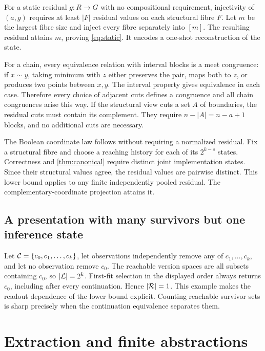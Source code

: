 For a static residual $g:R\to G$ with no compositional requirement, injectivity of $(a,g)$ requires at least $|F|$ residual values on each structural fibre $F$. Let $m$ be the largest fibre size and inject every fibre separately into $[m]$. The resulting residual attains $m$, proving \eqref{eq:static}. It encodes a one-shot reconstruction of the state.

For a chain, every equivalence relation with interval blocks is a meet congruence: if $x\sim y$, taking minimum with $z$ either preserves the pair, maps both to $z$, or produces two points between $x,y$. The interval property gives equivalence in each case. Therefore every choice of adjacent cuts defines a congruence and all chain congruences arise this way. If the structural view cuts a set $A$ of boundaries, the residual cuts must contain its complement. They require $n-|A|=n-a+1$ blocks, and no additional cuts are necessary.

The Boolean coordinate law follows without requiring a normalized residual. Fix a structural fibre and choose a reaching history for each of its $2^{k-s}$ states. Correctness and \cref{thm:canonical} require distinct joint implementation states. Since their structural values agree, the residual values are pairwise distinct. This lower bound applies to any finite independently pooled residual. The complementary-coordinate projection attains it.

\subsection{A presentation with many survivors but one inference state}
Let $\mathcal C=\{c_0,c_1,\ldots,c_k\}$, let observations independently remove any of $c_1,\ldots,c_k$, and let no observation remove $c_0$. The reachable version spaces are all subsets containing $c_0$, so $|\mathcal L|=2^k$. First-fit selection in the displayed order always returns $c_0$, including after every continuation. Hence $|\mathcal R|=1$. This example makes the readout dependence of the lower bound explicit. Counting reachable survivor sets is sharp precisely when the continuation equivalence separates them.

\section{Extraction and finite abstractions}\label{app:extraction}
